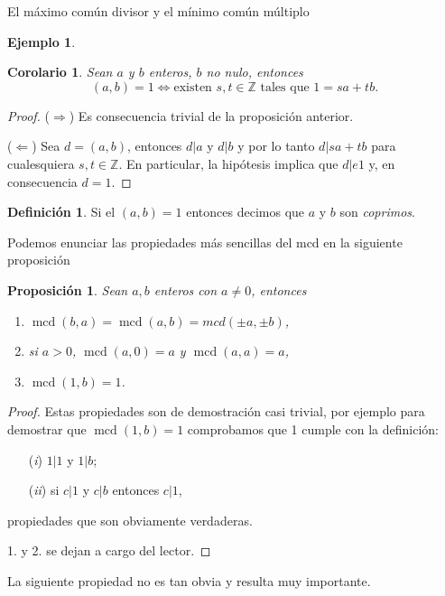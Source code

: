 \documentclass[11pt,spanish,makeidx]{amsbook}
\newtheorem{proposicion}[teorema]{Proposici\'on}
\newtheorem{corolario}[teorema]{Corolario}
\theoremstyle{definition}
\newtheorem{definicion}{Definici\'on}[section]
\newtheorem{ejemplo}{Ejemplo}[section]
\theoremstyle{remark}
\newcommand \mcd{\operatorname{mcd}}
\begin{document}
\begin{section}{El máximo común divisor y el mínimo común múltiplo}
\begin{ejemplo}
\begin{corolario} Sean $a$ y $b$ enteros, $b$ no nulo, entonces
	$$
	(a,b) = 1 \Leftrightarrow \text{existen $s,t \in \mathbb Z$ tales que $1 = sa+tb$.}
	$$
\end{corolario}
\begin{proof}
	($\Rightarrow$) Es consecuencia trivial de la proposición anterior.
	
	($\Leftarrow$) Sea $d = (a,b)$, entonces $d|a$ y $d|b$ y por lo tanto $d|sa+tb$ para cualesquiera   $s,t \in \mathbb Z$.  En particular, la hipótesis implica que $d |e 1$ y, en consecuencia $d =1$. 
\end{proof}

\begin{definicion}
	Si el $(a,b)=1$ entonces decimos que $a$ y $ b$ son {\em coprimos}.
\end{definicion}





\end{ejemplo}




Podemos enunciar las propiedades más sencillas del mcd en la siguiente proposición

\begin{proposicion} Sean $a,b$ enteros con $a \not = 0$, entonces
\begin{enumerate}
\item $\mcd(b,a) = \mcd(a,b) = mcd(\pm a, \pm b)$,
\item si $a>0$,  $\mcd(a,0) = a$ y $\mcd(a,a) = a$,
\item $\mcd(1,b) = 1$.
\end{enumerate}
\end{proposicion}
\begin{proof}
Estas propiedades son de demostración casi trivial, por ejemplo para demostrar que  $\mcd(1,b) = 1$ comprobamos que 1 cumple con la definición:
\begin{enumerate}
\item[({\em i})] $ 1|1$ y $1|b$;
\item[({\em ii})] si $ c|1 $ y $c|b$ entonces $ c|1$,
\end{enumerate}
propiedades que son obviamente verdaderas.

1. y 2.  se dejan a cargo del lector. 
\end{proof}

La siguiente propiedad no es tan obvia y resulta muy importante. 
 

\end{section}
\end{document}
